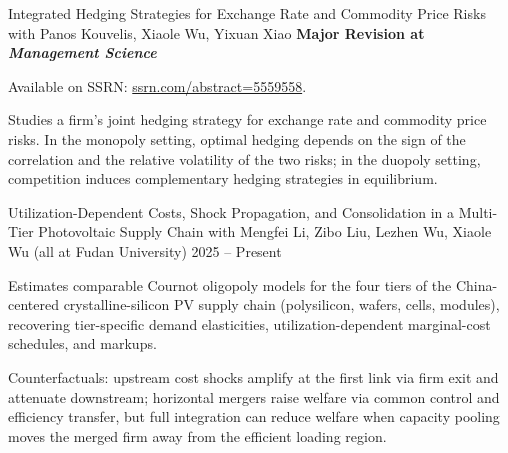 \documentclass[11pt, letterpaper]{awesome-cv}
\begin{document}
\begin{cventries}
  \cventry
    {Integrated Hedging Strategies for Exchange Rate and Commodity Price Risks}
    {with Panos Kouvelis, Xiaole Wu, Yixuan Xiao}
    {}
    {\textbf{Major Revision at \textit{Management Science}}}
    {
      \begin{cvitems}
        \item {Available on SSRN: \href{https://ssrn.com/abstract=5559558}{ssrn.com/abstract=5559558}.}
        \item {Studies a firm's joint hedging strategy for exchange rate and commodity price risks. In the monopoly setting, optimal hedging depends on the sign of the correlation and the relative volatility of the two risks; in the duopoly setting, competition induces complementary hedging strategies in equilibrium.}
      \end{cvitems}
    }

  \cventry
    {Utilization-Dependent Costs, Shock Propagation, and Consolidation in a Multi-Tier Photovoltaic Supply Chain}
    {with Mengfei Li, Zibo Liu, Lezhen Wu, Xiaole Wu (all at Fudan University)}
    {}
    {2025 -- Present}
    {
      \begin{cvitems}
        \item {Estimates comparable Cournot oligopoly models for the four tiers of the China-centered crystalline-silicon PV supply chain (polysilicon, wafers, cells, modules), recovering tier-specific demand elasticities, utilization-dependent marginal-cost schedules, and markups.}
        \item {Counterfactuals: upstream cost shocks amplify at the first link via firm exit and attenuate downstream; horizontal mergers raise welfare via common control and efficiency transfer, but full integration can reduce welfare when capacity pooling moves the merged firm away from the efficient loading region.}
      \end{cvitems}
    }
\end{cventries}
\end{document}
